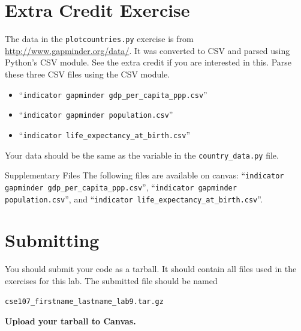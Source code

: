 \documentclass[11pt]{cselabheader}
\begin{document}
\section{Extra Credit Exercise}
\begin{extraex}[parsecsv.py]
The data in the \texttt{plotcountries.py} exercise is from
\url{http://www.gapminder.org/data/}. It was converted to CSV and
parsed using Python's CSV module. See the extra credit if you are
interested in this.  Parse these three CSV files using the CSV module.

\begin{itemize}
\item ``\texttt{indicator gapminder gdp\_per\_capita\_ppp.csv}''
\item ``\texttt{indicator gapminder population.csv}''
\item ``\texttt{indicator life\_expectancy\_at\_birth.csv}''
\end{itemize}

Your data should be the same as the  variable in
the \texttt{country\_data.py} file.
\end{extraex}

\begin{infobox}{Supplementary Files}
The following files are available on canvas:
``\texttt{indicator gapminder gdp\_per\_capita\_ppp.csv}'',
``\texttt{indicator gapminder population.csv}'',
and ``\texttt{indicator life\_expectancy\_at\_birth.csv}''.
\end{infobox}


\newpage
\section{Submitting}

You should submit your code as a tarball. It should contain all files
used in the exercises for this lab. The submitted file should be named
\begin{center}
  \texttt{cse107\_firstname\_lastname\_lab9.tar.gz}
\end{center}

\begin{center}
  \textbf{Upload your tarball to Canvas.}
\end{center}

\listofexercises
\listofextraexercises
\end{document}
